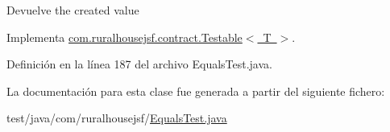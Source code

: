 \begin{DoxyReturn}{Devuelve}
the created value 
\end{DoxyReturn}


Implementa \mbox{\hyperlink{interfacecom_1_1ruralhousejsf_1_1contract_1_1_testable_ae4546a381488faaba1ef7c0f8688de9c}{com.\+ruralhousejsf.\+contract.\+Testable$<$ T $>$}}.



Definición en la línea 187 del archivo Equals\+Test.\+java.



La documentación para esta clase fue generada a partir del siguiente fichero\+:\begin{DoxyCompactItemize}
\item 
test/java/com/ruralhousejsf/\mbox{\hyperlink{_equals_test_8java}{Equals\+Test.\+java}}\end{DoxyCompactItemize}

